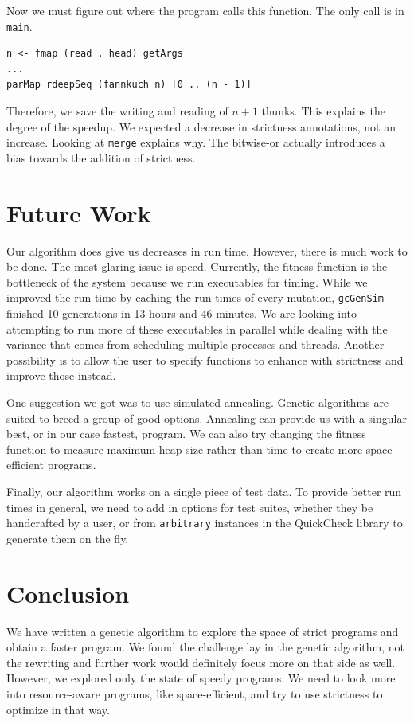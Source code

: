 \documentclass[preprint,nocopyrightspace]{sigplanconf}
\begin{document}
Now we must figure out where the program calls this function. The only call is in \lstinline!main!.
\begin{lstlisting}
n <- fmap (read . head) getArgs
...
parMap rdeepSeq (fannkuch n) [0 .. (n - 1)]
\end{lstlisting}

Therefore, we save the writing and reading of $n+1$ thunks. This explains the degree of the speedup. We expected a decrease in strictness annotations, not an increase. Looking at \lstinline!merge! explains why. The bitwise-or actually introduces a bias towards the addition of strictness.


\section{Future Work}\label{sec:futr}
Our algorithm does give us decreases in run time. However, there is much work to be done. The most glaring issue is speed. Currently, the fitness function is the bottleneck of the system because we run executables for timing. While we improved the run time by caching the run times of every mutation, \lstinline!gcGenSim! finished 10 generations in 13 hours and 46 minutes. We are looking into attempting to run more of these executables in parallel while dealing with the variance that comes from scheduling multiple processes and threads. Another possibility is to allow the user to specify functions to enhance with strictness and improve those instead.

One suggestion we got was to use simulated annealing. Genetic algorithms are suited to breed a group of good options. Annealing can provide us with a singular best, or in our case fastest, program. We can also try changing the fitness function to measure maximum heap size rather than time to create more space-efficient programs.

Finally, our algorithm works on a single piece of test data. To provide better run times in general, we need to add in options for test suites, whether they be handcrafted by a user, or from \lstinline!arbitrary! instances in the QuickCheck library to generate them on the fly.
\section{Conclusion}\label{sec:conc}
We have written a genetic algorithm to explore the space of strict programs and obtain a faster program. We found the challenge lay in the genetic algorithm, not the rewriting and further work would definitely focus more on that side as well. However, we explored only the state of speedy programs. We need to look more into resource-aware programs, like space-efficient, and try to use strictness to optimize in that way.
%
\end{document}
